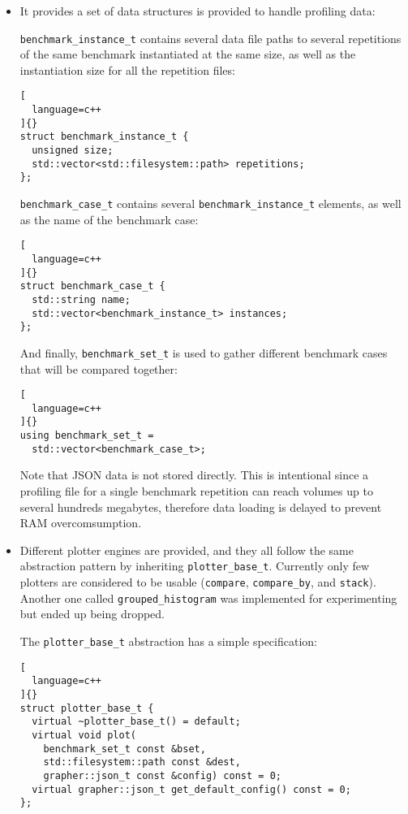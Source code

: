 \documentclass[../main]{subfiles}
\begin{document}
\begin{itemize}
\item

  It provides a set of data structures is provided to handle profiling data:

  \lstinline{benchmark_instance_t} contains several data file paths to several
  repetitions of the same benchmark instantiated at the same size, as well
  as the instantiation size for all the repetition files:

\begin{lstlisting}[
  language=c++
]{}
struct benchmark_instance_t {
  unsigned size;
  std::vector<std::filesystem::path> repetitions;
};
\end{lstlisting}

\clearpage%

  \lstinline{benchmark_case_t} contains several \lstinline{benchmark_instance_t}
  elements, as well as the name of the benchmark case:

\begin{lstlisting}[
  language=c++
]{}
struct benchmark_case_t {
  std::string name;
  std::vector<benchmark_instance_t> instances;
};
\end{lstlisting}

  And finally, \lstinline{benchmark_set_t} is used to gather
  different benchmark cases that will be compared together:

\begin{lstlisting}[
  language=c++
]{}
using benchmark_set_t =
  std::vector<benchmark_case_t>;
\end{lstlisting}

  Note that JSON data is not stored directly.
  This is intentional since a profiling file for a single benchmark repetition
  can reach volumes up to several hundreds megabytes, therefore data loading
  is delayed to prevent RAM overcomsumption.

\item

  Different plotter engines are provided, and they all follow the same
  abstraction pattern by inheriting \lstinline{plotter_base_t}.
  Currently only few plotters are considered to be usable
  (\lstinline{compare}, \lstinline{compare_by}, and \lstinline{stack}).
  Another one called \lstinline{grouped_histogram} was implemented
  for experimenting but ended up being dropped.

  The \lstinline{plotter_base_t} abstraction has a simple specification:
\begin{lstlisting}[
  language=c++
]{}
struct plotter_base_t {
  virtual ~plotter_base_t() = default;
  virtual void plot(
    benchmark_set_t const &bset,
    std::filesystem::path const &dest,
    grapher::json_t const &config) const = 0;
  virtual grapher::json_t get_default_config() const = 0;
};
\end{lstlisting}


\end{itemize}
\end{document}
